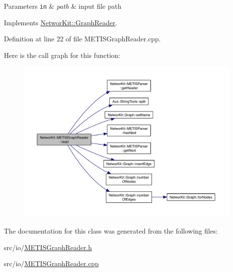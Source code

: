 \begin{DoxyParams}[1]{Parameters}
\mbox{\tt in}  & {\em path} & input file path \\
\hline
\end{DoxyParams}


Implements \hyperlink{class_networ_kit_1_1_graph_reader_a0ba1d66a137702c06be52c648b95d572}{Networ\-Kit\-::\-Graph\-Reader}.



Definition at line 22 of file M\-E\-T\-I\-S\-Graph\-Reader.\-cpp.



Here is the call graph for this function\-:\nopagebreak
\begin{figure}[H]
\begin{center}
\leavevmode
\includegraphics[width=350pt]{class_networ_kit_1_1_m_e_t_i_s_graph_reader_a82e63d4d0e6383be034db6082478a94d_cgraph}
\end{center}
\end{figure}




The documentation for this class was generated from the following files\-:\begin{DoxyCompactItemize}
\item 
src/io/\hyperlink{_m_e_t_i_s_graph_reader_8h}{M\-E\-T\-I\-S\-Graph\-Reader.\-h}\item 
src/io/\hyperlink{_m_e_t_i_s_graph_reader_8cpp}{M\-E\-T\-I\-S\-Graph\-Reader.\-cpp}\end{DoxyCompactItemize}
